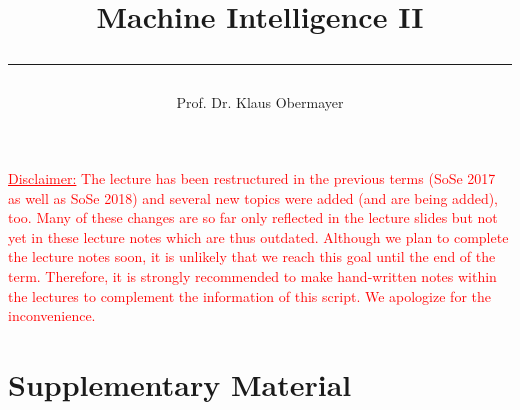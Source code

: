 \documentclass[a4paper,11pt,titlepage]{article}
\title{Machine Intelligence II\\\rule{0.75\textwidth}{2pt}}
\author{Prof. Dr. Klaus Obermayer}
\begin{document}
\maketitle
\noindent \textcolor{red}{\underline{Disclaimer:} The lecture has been restructured in the previous terms (SoSe 2017 as well as SoSe 2018) and several new topics were added (and are being added), too. Many of these changes are so far only reflected in the lecture slides but not yet in these lecture notes which are thus outdated. Although we plan to complete the lecture notes soon, it is unlikely that we reach this goal until the end of the term. Therefore, it is strongly recommended to make hand-written notes within the lectures to complement the information of this script. We apologize for the inconvenience.}
\newpage
\tableofcontents
\newpage


\setcounter{section}{-1}


\section{Supplementary Material}
\setcounter{equation}{0}







\newpage						%



\printbibliography 
\end{document}
